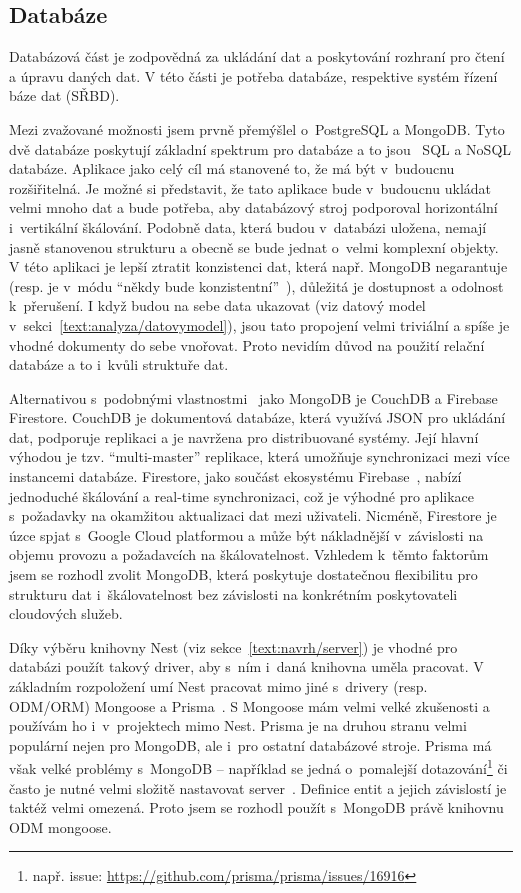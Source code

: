 \subsection{Databáze}\label{text:navrh/databaze}

Databázová část je zodpovědná za ukládání dat a poskytování rozhraní pro čtení a úpravu daných dat. 
V této části je potřeba databáze, respektive systém řízení báze dat (SŘBD).

Mezi zvažované možnosti jsem prvně přemýšlel o~PostgreSQL a MongoDB.
Tyto dvě databáze poskytují základní spektrum pro databáze a to jsou~\cite{irena2015big, marek2018sql} SQL a NoSQL databáze. 
Aplikace jako celý cíl má stanovené to, že má být v~budoucnu rozšiřitelná.
Je možné si představit, že tato aplikace bude v~budoucnu ukládat velmi mnoho dat a bude potřeba, aby databázový stroj podporoval horizontální i~vertikální škálování.
Podobně data, která budou v~databázi uložena, nemají jasně stanovenou strukturu a obecně se bude jednat o~velmi komplexní objekty.
V této aplikaci je lepší ztratit konzistenci dat, která např. MongoDB negarantuje (resp. je v~módu \enquote{někdy bude konzistentní}~\cite{irena2015big}), důležitá je dostupnost a odolnost k~přerušení.
I když budou na sebe data ukazovat (viz datový model v~sekci~\ref{text:analyza/datovymodel}), jsou tato propojení velmi triviální a spíše je vhodné dokumenty do sebe vnořovat.
Proto nevidím důvod na použití relační databáze a to i~kvůli struktuře dat.

Alternativou s~podobnými vlastnostmi~\cite{irena2015big} jako MongoDB je CouchDB a Firebase Firestore. 
CouchDB je dokumentová databáze, která využívá JSON pro ukládání dat, podporuje replikaci a je navržena pro distribuované systémy. 
Její hlavní výhodou je tzv. \enquote{multi-master} replikace, která umožňuje synchronizaci mezi více instancemi databáze. 
Firestore, jako součást ekosystému Firebase~\cite{firebase}, nabízí jednoduché škálování a real-time synchronizaci, což je výhodné pro aplikace s~požadavky na okamžitou aktualizaci dat mezi uživateli. 
Nicméně, Firestore je úzce spjat s~Google Cloud platformou a může být nákladnější v~závislosti na objemu provozu a požadavcích na škálovatelnost. 
Vzhledem k~těmto faktorům jsem se rozhodl zvolit MongoDB, která poskytuje dostatečnou flexibilitu pro strukturu dat i~škálovatelnost bez závislosti na konkrétním poskytovateli cloudových služeb.

Díky výběru knihovny Nest (viz sekce~\ref{text:navrh/server}) je vhodné pro databázi použít takový driver, aby s~ním i~daná knihovna uměla pracovat.
V základním rozpoložení umí Nest pracovat mimo jiné s~drivery (resp. ODM/ORM) Mongoose a Prisma~\cite{nest_database}.
S Mongoose mám velmi velké zkušenosti a používám ho i~v~projektech mimo Nest.
Prisma je na druhou stranu velmi populární nejen pro MongoDB, ale i~pro ostatní databázové stroje.
Prisma má však velké problémy s~MongoDB -- například se jedná o~pomalejší dotazování\footnote{např. issue: \url{https://github.com/prisma/prisma/issues/16916}} či často je nutné velmi složitě nastavovat server~\cite{prisma_2025}.
Definice entit a jejich závislostí je taktéž velmi omezená.
Proto jsem se rozhodl použít s~MongoDB právě knihovnu ODM mongoose.

